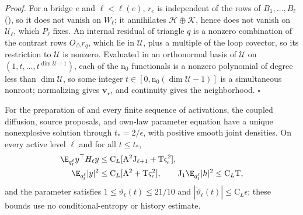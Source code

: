 \noindent\emph{Proof.}
For a bridge \(e\) and \(\ell<\ell(e)\), \(r_e\) is independent of the rows of
\(B_1,\ldots,B_\ell\) (), so it does not vanish
on \(W_\ell\); it annihilates \(\mathcal H\oplus\mathcal K\), hence does not
vanish on \(\mathcal U_\ell\), which \(P_\ell\) fixes. An internal residual of
triangle \(q\) is a nonzero combination of the contrast rows
\(O_\triangle r_q\), which lie in \(\mathcal U\), plus a multiple of the loop
covector, so its restriction to \(\mathcal U\) is nonzero. Evaluated in an
orthonormal basis of \(\mathcal U\) on \((1,t,\ldots,t^{\dim\mathcal U-1})\),
each of the \(\mathrm n_0\) functionals is a nonzero polynomial of degree less
than \(\dim\mathcal U\), so some integer \(t\in[0,\mathrm n_0(\dim\mathcal U-1)]\)
is a simultaneous nonroot; normalizing gives \(\mathbf v_\star\), and
continuity gives the neighborhood. \(\square\)

For the preparation of  and every finite
sequence of activations, the coupled diffusion, source proposals, and own-law
parameter equation have a unique nonexplosive solution through
\(t_*=2/\epsilon\), with positive smooth joint densities. On every active level
\(\ell\) and for all \(t\le t_*\),
\begin{align}
 \E_{q_t^\ell}y^\top H_\ell y
 &\le \mathrm C_L[\mathrm A^2\mathrm J_{\ell+1}+\mathrm T\varsigma_\epsilon^2],
 \label{eq:rg-formation-actual-energy}\\
 \E_{q_t^\ell}|y|^2
 &\le \mathrm C_L[\mathrm A^2+\mathrm T\varsigma_\epsilon^2],
 \qquad \mathrm J_1\E_{q_t^\ell}|h|^2\le \mathrm C_L\mathrm T,
 \label{eq:rg-formation-actual-moments}
\end{align}
and the parameter satisfies \(1\le\vartheta_\ell(t)\le21/10\) and
\(|\dot\vartheta_\ell(t)|\le\mathrm C_L\epsilon\); these bounds use no
conditional-entropy or history estimate. 

